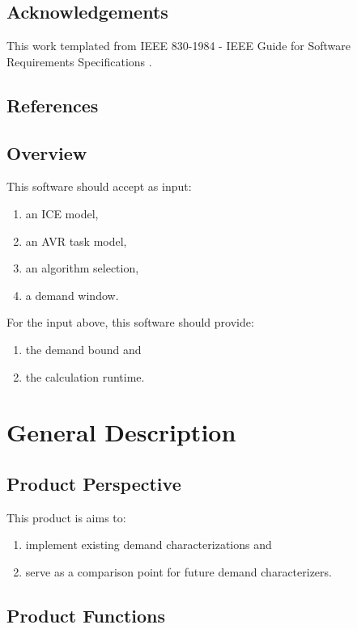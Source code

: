 \documentclass[12pt,a4paper]{article}
\begin{document}
\subsection{Acknowledgements}
This work templated from IEEE 830-1984 - IEEE Guide for Software Requirements
Specifications \cite{ieee_ieee_1984}.

\subsection{References}



\subsection{Overview}
This software should accept as input:
\begin{enumerate}
    \item an ICE model,
    \item an AVR task model,
    \item an algorithm selection,
    \item a demand window.
\end{enumerate}
For the input above, this software should provide:
\begin{enumerate}
    \item the demand bound and
    \item the calculation runtime.
\end{enumerate}

\section{General Description}
\subsection{Product Perspective}

This product is aims to:
\begin{enumerate}
    \item implement existing demand characterizations and
    \item serve as a comparison point for future demand characterizers.
\end{enumerate}

\subsection{Product Functions}
\end{document}
